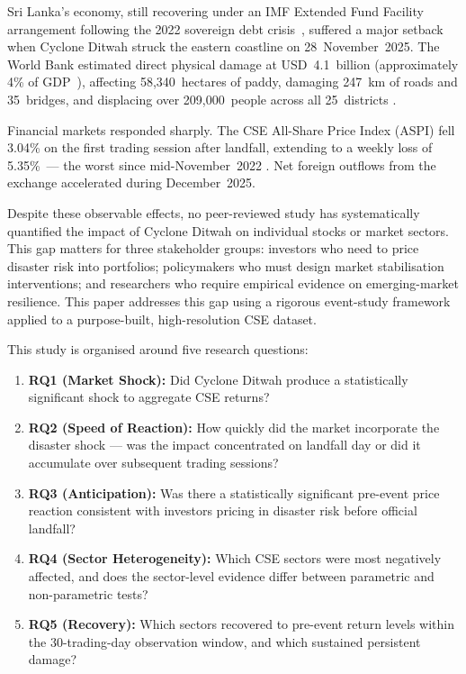 \documentclass[sigconf, nonacm]{acmart}
\begin{document}
Sri Lanka's economy, still recovering under an IMF Extended Fund Facility
arrangement following the 2022 sovereign debt crisis~\cite{imf2025},
suffered a major setback when Cyclone Ditwah struck the eastern coastline
on 28~November~2025. The World Bank estimated direct physical damage at
USD~4.1~billion (approximately 4\% of GDP~\cite{worldbank2025}), affecting
58,340~hectares of paddy, damaging 247~km of roads and 35~bridges, and
displacing over 209,000~people across all 25~districts
\cite{who2025,ocha2025}.

Financial markets responded sharply. The CSE All-Share Price Index (ASPI)
fell 3.04\% on the first trading session after landfall, extending to a
weekly loss of 5.35\%~--- the worst since mid-November~2022
\cite{brecorder2025}. Net foreign outflows from the exchange accelerated
during December~2025.

Despite these observable effects, no peer-reviewed study has systematically
quantified the impact of Cyclone Ditwah on individual stocks or market
sectors. This gap matters for three stakeholder groups: investors who need
to price disaster risk into portfolios; policymakers who must design market
stabilisation interventions; and researchers who require empirical evidence
on emerging-market resilience. This paper addresses this gap using a
rigorous event-study framework~\cite{mackinlay1997} applied to a
purpose-built, high-resolution CSE dataset.

This study is organised around five research questions:

\begin{enumerate}
  \item \textbf{RQ1 (Market Shock):} Did Cyclone Ditwah produce a
        statistically significant shock to aggregate CSE returns?
  \item \textbf{RQ2 (Speed of Reaction):} How quickly did the market
        incorporate the disaster shock --- was the impact concentrated on
        landfall day or did it accumulate over subsequent trading sessions?
  \item \textbf{RQ3 (Anticipation):} Was there a statistically significant
        pre-event price reaction consistent with investors pricing in
        disaster risk before official landfall?
  \item \textbf{RQ4 (Sector Heterogeneity):} Which CSE sectors were most
        negatively affected, and does the sector-level evidence differ
        between parametric and non-parametric tests?
  \item \textbf{RQ5 (Recovery):} Which sectors recovered to pre-event
        return levels within the 30-trading-day observation window, and
        which sustained persistent damage?
\end{enumerate}
\end{document}
